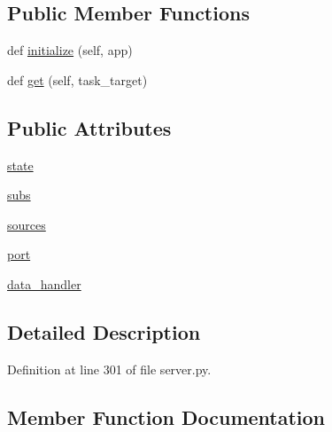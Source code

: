 \subsection*{Public Member Functions}
\begin{DoxyCompactItemize}
\item 
def \hyperlink{classparlai_1_1mturk_1_1webapp_1_1server_1_1RunHandler_abec3206f51ca4edd33ce201ef4131581}{initialize} (self, app)
\item 
def \hyperlink{classparlai_1_1mturk_1_1webapp_1_1server_1_1RunHandler_acf94dbda8676931e2ac205e2c8420b39}{get} (self, task\+\_\+target)
\end{DoxyCompactItemize}
\subsection*{Public Attributes}
\begin{DoxyCompactItemize}
\item 
\hyperlink{classparlai_1_1mturk_1_1webapp_1_1server_1_1RunHandler_a8c691d0a32bac2c64f4cdf8861cfa3fa}{state}
\item 
\hyperlink{classparlai_1_1mturk_1_1webapp_1_1server_1_1RunHandler_a3888f3782c09030eb6eed0bb3734b4c6}{subs}
\item 
\hyperlink{classparlai_1_1mturk_1_1webapp_1_1server_1_1RunHandler_af824a31f541d4421205f883d32ea87fe}{sources}
\item 
\hyperlink{classparlai_1_1mturk_1_1webapp_1_1server_1_1RunHandler_a18313aaf7e807891e1d21b0930639ca9}{port}
\item 
\hyperlink{classparlai_1_1mturk_1_1webapp_1_1server_1_1RunHandler_a55ebe293c2c36001b28f879a256fb03d}{data\+\_\+handler}
\end{DoxyCompactItemize}


\subsection{Detailed Description}


Definition at line 301 of file server.\+py.



\subsection{Member Function Documentation}
\mbox{\label{classparlai_1_1mturk_1_1webapp_1_1server_1_1RunHandler_acf94dbda8676931e2ac205e2c8420b39}} 
